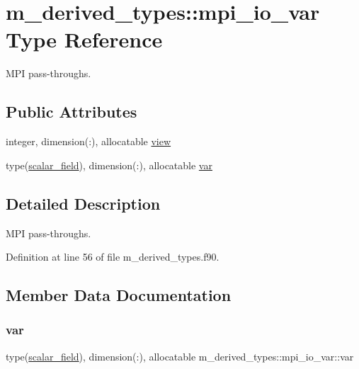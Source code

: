 \hypertarget{structm__derived__types_1_1mpi__io__var}{}\section{m\+\_\+derived\+\_\+types\+:\+:mpi\+\_\+io\+\_\+var Type Reference}
\label{structm__derived__types_1_1mpi__io__var}


M\+PI pass-\/throughs.  


\subsection*{Public Attributes}
\begin{DoxyCompactItemize}
\item 
integer, dimension(\+:), allocatable \hyperlink{structm__derived__types_1_1mpi__io__var_a19194d57a71bab3f81f1bb6c05743fed}{view}
\item 
type(\hyperlink{structm__derived__types_1_1scalar__field}{scalar\+\_\+field}), dimension(\+:), allocatable \hyperlink{structm__derived__types_1_1mpi__io__var_a41c471a62a6f28ebeeee8e51327d59f7}{var}
\end{DoxyCompactItemize}


\subsection{Detailed Description}
M\+PI pass-\/throughs. 

Definition at line 56 of file m\+\_\+derived\+\_\+types.\+f90.



\subsection{Member Data Documentation}
\mbox{\label{structm__derived__types_1_1mpi__io__var_a41c471a62a6f28ebeeee8e51327d59f7}} 
\subsubsection{\texorpdfstring{var}{var}}
{\footnotesize\ttfamily type(\hyperlink{structm__derived__types_1_1scalar__field}{scalar\+\_\+field}), dimension(\+:), allocatable m\+\_\+derived\+\_\+types\+::mpi\+\_\+io\+\_\+var\+::var}



